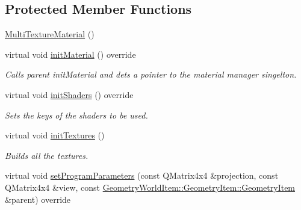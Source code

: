 \subsection*{Protected Member Functions}
\begin{DoxyCompactItemize}
\item 
\mbox{\hyperlink{class_geometry_engine_1_1_geometry_material_1_1_multi_texture_material_a7876cf2b9f032b7fb0509415cb37a40c}{Multi\+Texture\+Material}} ()
\item 
\mbox{\label{class_geometry_engine_1_1_geometry_material_1_1_multi_texture_material_a8b14ccf51c5360824575544a56eeac39}} 
virtual void \mbox{\hyperlink{class_geometry_engine_1_1_geometry_material_1_1_multi_texture_material_a8b14ccf51c5360824575544a56eeac39}{init\+Material}} () override
\begin{DoxyCompactList}\small\item\em Calls parent init\+Material and dets a pointer to the material manager singelton. \end{DoxyCompactList}\item 
\mbox{\label{class_geometry_engine_1_1_geometry_material_1_1_multi_texture_material_aa5dd9c755aa814d4655355227aa68d1d}} 
virtual void \mbox{\hyperlink{class_geometry_engine_1_1_geometry_material_1_1_multi_texture_material_aa5dd9c755aa814d4655355227aa68d1d}{init\+Shaders}} () override
\begin{DoxyCompactList}\small\item\em Sets the keys of the shaders to be used. \end{DoxyCompactList}\item 
\mbox{\label{class_geometry_engine_1_1_geometry_material_1_1_multi_texture_material_a236d4a16f756444e8a3ed5997efabb2e}} 
virtual void \mbox{\hyperlink{class_geometry_engine_1_1_geometry_material_1_1_multi_texture_material_a236d4a16f756444e8a3ed5997efabb2e}{init\+Textures}} ()
\begin{DoxyCompactList}\small\item\em Builds all the textures. \end{DoxyCompactList}\item 
virtual void \mbox{\hyperlink{class_geometry_engine_1_1_geometry_material_1_1_multi_texture_material_a5f07e3b2b0867d3905f912159ef2f67b}{set\+Program\+Parameters}} (const Q\+Matrix4x4 \&projection, const Q\+Matrix4x4 \&view, const \mbox{\hyperlink{class_geometry_engine_1_1_geometry_world_item_1_1_geometry_item_1_1_geometry_item}{Geometry\+World\+Item\+::\+Geometry\+Item\+::\+Geometry\+Item}} \&parent) override

\end{DoxyCompactItemize}
